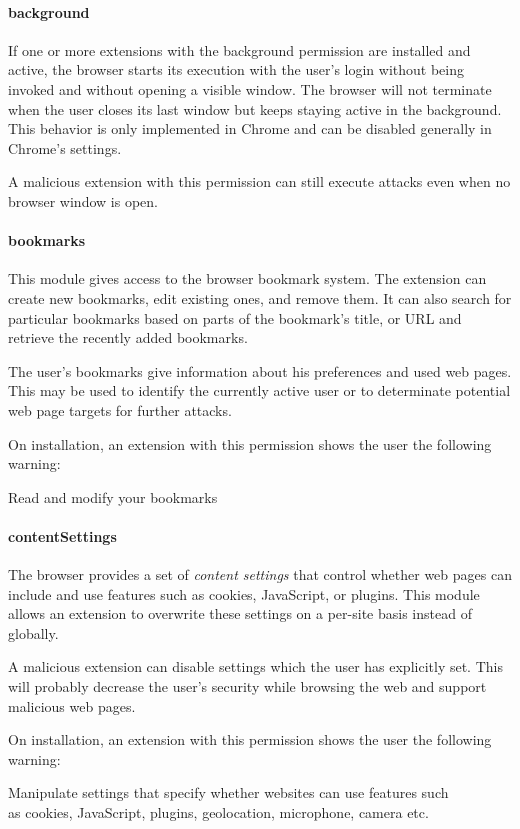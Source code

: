 \paragraph{background}
	If one or more extensions with the background permission are installed and active, the browser starts its execution with the user's login without being invoked and without opening a visible window. The browser will not terminate when the user closes its last window but keeps staying active in the background. This behavior is only implemented in Chrome and can be disabled generally in Chrome's settings.
	
	A malicious extension with this permission can still execute attacks even when no browser window is open.
	
\paragraph{bookmarks} 
	This module gives access to the browser bookmark system. The extension can create new bookmarks, edit existing ones, and remove them. It can also search for particular bookmarks based on parts of the bookmark's title, or URL and retrieve the recently added bookmarks.

	The user's bookmarks give information about his preferences and used web pages. This may be used to identify the currently active user or to determinate potential web page targets for further attacks.
 
	On installation, an extension with this permission shows the user the following warning:
	\begin{permissionwarning}
	 	Read and modify your bookmarks
	\end{permissionwarning}

\paragraph{contentSettings} 
	The browser provides a set of \textit{content settings} that control whether web pages can include and use features such as cookies, JavaScript, or plugins. This module  allows an extension to overwrite these settings on a per-site basis instead of globally.

	A malicious extension can disable settings which the user has explicitly set. This will probably decrease the user's security while browsing the web and support malicious web pages.

	On installation, an extension with this permission shows the user the following warning:
	\begin{permissionwarning}
	 	Manipulate settings that specify whether websites can use features such\\as cookies, JavaScript, plugins, geolocation, microphone, camera etc.
	\end{permissionwarning}

